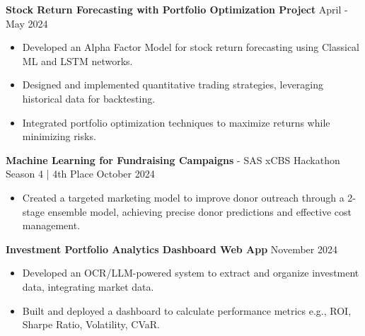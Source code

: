 \documentclass[a4paper, 11pt]{article}
\begin{document}
\vspace{3pt}

\textbf{Stock Return Forecasting with Portfolio Optimization Project} \hfill April - May 2024
\begin{itemize}[noitemsep, topsep=0pt, partopsep=0pt, parsep=0pt]
    \item Developed an Alpha Factor Model for stock return forecasting using Classical ML and LSTM networks.
    \item Designed and implemented quantitative trading strategies, leveraging historical data for backtesting.
    \item Integrated portfolio optimization techniques to maximize returns while minimizing risks.
\end{itemize}

\vspace{3pt}

\textbf{Machine Learning for Fundraising Campaigns} - SAS xCBS Hackathon Season 4 | 4th Place \hfill October 2024
\begin{itemize}[noitemsep, topsep=0pt, partopsep=0pt, parsep=0pt]
    \item Created a targeted marketing model to improve donor outreach through a 2-stage ensemble model, achieving precise donor predictions and effective cost management.
\end{itemize}

\vspace{3pt}

\textbf{Investment Portfolio Analytics Dashboard Web App} \hfill November 2024
\begin{itemize}[noitemsep, topsep=0pt, partopsep=0pt, parsep=0pt]
    \item Developed an OCR/LLM-powered system to extract and organize investment data, integrating market data.
    \item Built and deployed a dashboard to calculate performance metrics e.g., ROI, Sharpe Ratio, Volatility, CVaR.
\end{itemize}
\end{document}
